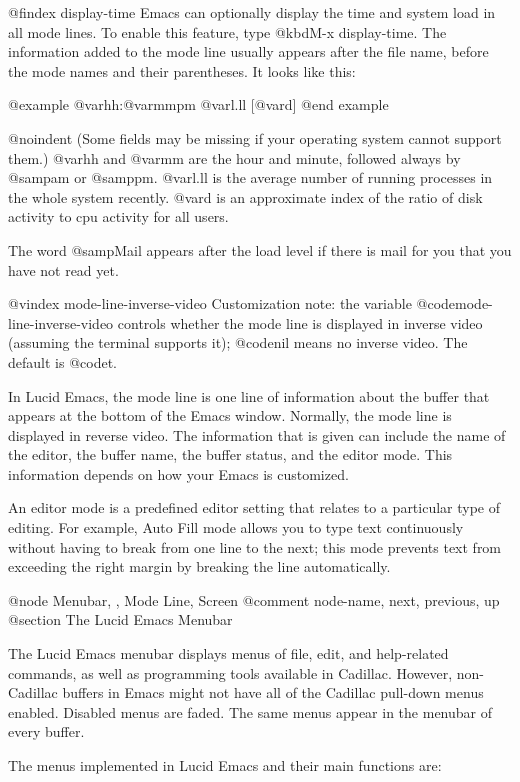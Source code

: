 {{@findex display-time
  Emacs can optionally display the time and system load in all mode lines.
To enable this feature, type @kbd{M-x display-time}.  The information added
to the mode line usually appears after the file name, before the mode names
and their parentheses.  It looks like this:

@example
@var{hh}:@var{mm}pm @var{l.ll} [@var{d}]
@end example

@noindent
(Some fields may be missing if your operating system cannot support them.)
@var{hh} and @var{mm} are the hour and minute, followed always by @samp{am}
or @samp{pm}.  @var{l.ll} is the average number of running processes in the
whole system recently.  @var{d} is an approximate index of the ratio of
disk activity to cpu activity for all users.

The word @samp{Mail} appears after the load level if there is mail for
you that you have not read yet.

@vindex mode-line-inverse-video
  Customization note: the variable @code{mode-line-inverse-video} controls
whether the mode line is displayed in inverse video (assuming the terminal
supports it); @code{nil} means no inverse video.  The default is @code{t}.

In Lucid Emacs, the mode line is one line of information about the buffer that 
appears at the bottom of the Emacs window. Normally, the mode 
line is displayed in reverse video. The information that is given can 
include the name of the editor, the buffer name, the buffer status, 
and the editor mode. This information depends on how your Emacs 
is customized.  

An editor mode is a predefined editor setting that relates to a 
particular type of editing. For example, Auto Fill mode allows you 
to type text continuously without having to break from one line to 
the next; this mode prevents text from exceeding the right margin 
by breaking the line automatically. 

@node Menubar, , Mode Line, Screen
@comment  node-name,  next,  previous,  up
@section The Lucid Emacs Menubar

The Lucid Emacs menubar displays menus of file, edit, and help-related commands,
as well as
programming tools available in Cadillac.   
However, non-Cadillac buffers in Emacs might not have all of the 
Cadillac pull-down menus enabled. Disabled menus are faded. The same 
menus appear in the menubar of every buffer. 

The menus implemented in Lucid Emacs
and their main functions are:

}}
